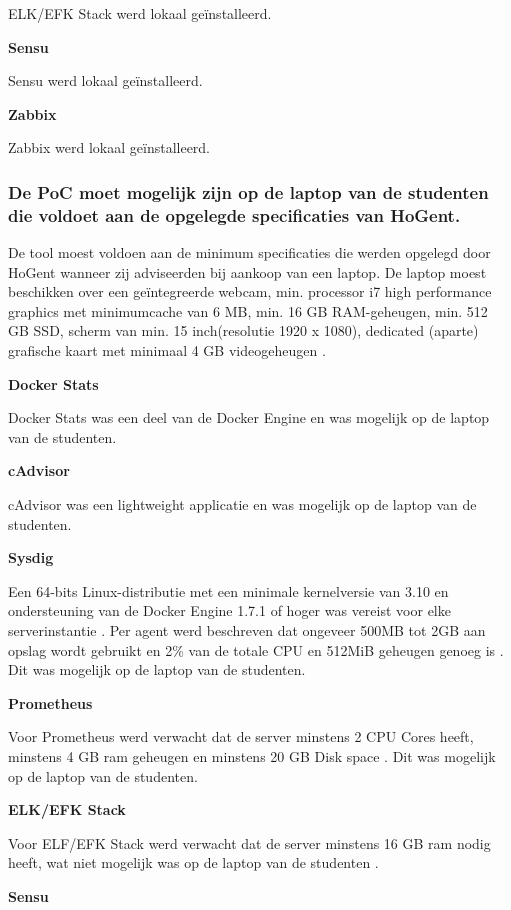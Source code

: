 ELK/EFK Stack werd lokaal geïnstalleerd.

\textbf{Sensu}

Sensu werd lokaal geïnstalleerd.

\textbf{Zabbix}

Zabbix werd lokaal geïnstalleerd.

\subsubsection{De PoC moet mogelijk zijn op de laptop van de studenten die voldoet aan de opgelegde specificaties van HoGent.}

De tool moest voldoen aan de minimum specificaties die werden opgelegd door HoGent wanneer zij adviseerden bij aankoop van een laptop. De laptop moest beschikken over een geïntegreerde webcam, min. processor i7 high performance graphics met minimumcache van 6 MB, min. 16 GB RAM-geheugen, min. 512 GB SSD, scherm van min. 15 inch(resolutie 1920 x 1080), dedicated (aparte) grafische kaart met minimaal 4 GB videogeheugen \autocite{HoGent}.

\textbf{Docker Stats} 

Docker Stats was een deel van de Docker Engine en was mogelijk op de laptop van de studenten.

\textbf{cAdvisor}

cAdvisor was een lightweight applicatie en was mogelijk op de laptop van de studenten.

\textbf{Sysdig}

Een 64-bits Linux-distributie met een minimale kernelversie van 3.10 en ondersteuning van de Docker Engine 1.7.1 of hoger was vereist voor elke serverinstantie \autocite{SysdigB2020}. Per agent werd beschreven dat ongeveer 500MB tot 2GB aan opslag wordt gebruikt en 2\% van de totale CPU en 512MiB geheugen genoeg is \autocite{SysdigA2020}. Dit was mogelijk op de laptop van de studenten.

\textbf{Prometheus}

Voor Prometheus werd verwacht dat de server minstens 2 CPU Cores heeft, minstens 4 GB ram geheugen en minstens 20 GB Disk space \autocite{oreilly}. Dit was mogelijk op de laptop van de studenten.

\textbf{ELK/EFK Stack}

Voor ELF/EFK Stack werd verwacht dat de server minstens 16 GB ram nodig heeft, wat niet mogelijk was op de laptop van de studenten \autocite{Elastic}.

\textbf{Sensu}


